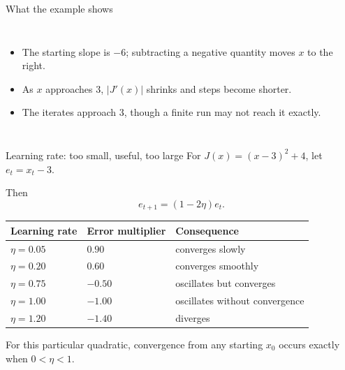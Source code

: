 \documentclass[aspectratio=169,11pt]{beamer}
\begin{document}
\begin{frame}{What the example shows}
\begin{columns}[T]
\begin{itemize}
\item The starting slope is $-6$; subtracting a negative quantity moves $x$ to the right.
\item As $x$ approaches 3, $|J'(x)|$ shrinks and steps become shorter.
\item The iterates approach 3, though a finite run may not reach it exactly.
\end{itemize}
\end{columns}
\end{frame}

\begin{frame}{Learning rate: too small, useful, too large}
For $J(x)=(x-3)^2+4$, let $e_t=x_t-3$.

Then
\[
e_{t+1}=(1-2\eta)e_t.
\]

\begin{center}
\begin{tabular}{lll}
\toprule
Learning rate & Error multiplier & Consequence\\
\midrule
$\eta=0.05$ & $0.90$ & converges slowly\\
$\eta=0.20$ & $0.60$ & converges smoothly\\
$\eta=0.75$ & $-0.50$ & oscillates but converges\\
$\eta=1.00$ & $-1.00$ & oscillates without convergence\\
$\eta=1.20$ & $-1.40$ & diverges\\
\bottomrule
\end{tabular}
\end{center}

For this particular quadratic, convergence from any starting $x_0$ occurs exactly when $0<\eta<1$.
\end{frame}
\end{document}
